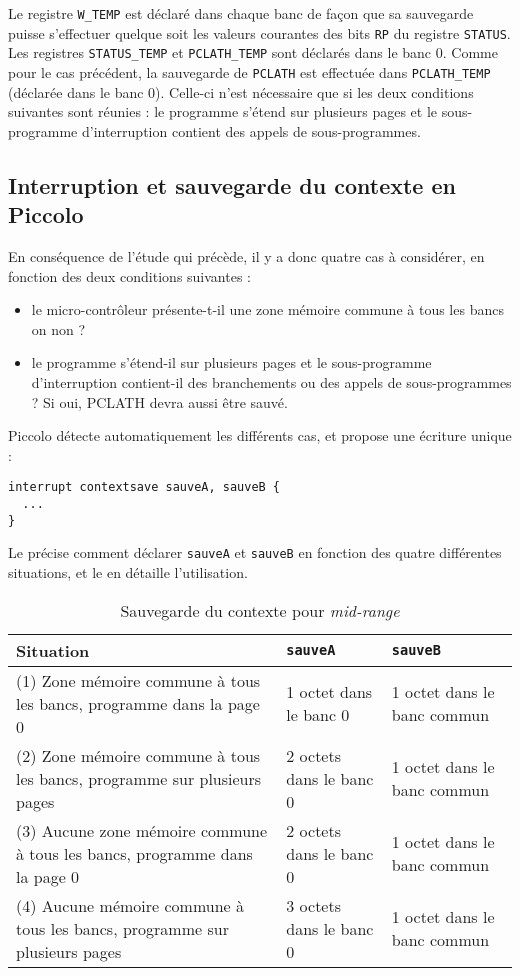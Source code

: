Le registre \texttt{W\_TEMP} est déclaré dans chaque banc de façon que sa sauvegarde puisse s’effectuer quelque soit les valeurs courantes des bits \texttt{RP} du registre \texttt{STATUS}. Les registres \texttt{STATUS\_TEMP} et \texttt{PCLATH\_TEMP} sont déclarés dans le banc 0. Comme pour le cas précédent, la sauvegarde de \texttt{PCLATH} est effectuée dans \texttt{PCLATH\_TEMP} (déclarée dans le banc 0). Celle-ci n'est nécessaire que si les deux conditions suivantes sont réunies : le programme s’étend sur plusieurs pages et le sous-programme d’interruption contient des appels de sous-programmes.


\subsection{Interruption et sauvegarde du contexte en Piccolo}

En conséquence de l'étude qui précède, il y a donc quatre cas à considérer, en fonction des deux conditions suivantes :
\begin{itemize}
  \item le micro-contrôleur présente-t-il une zone mémoire commune à tous les bancs on non ?
  \item le programme s’étend-il sur plusieurs pages et le sous-programme d’interruption contient-il des branchements ou des appels de sous-programmes ? Si oui, PCLATH devra aussi être sauvé.
\end{itemize}


Piccolo détecte automatiquement les différents cas, et propose une écriture unique :
\begin{lstlisting}[language=piccolo]
interrupt contextsave sauveA, sauveB {
  ...
}
\end{lstlisting}

Le  précise comment déclarer \texttt{sauveA} et \texttt{sauveB} en fonction des quatre différentes situations, et le  en détaille l'utilisation.

\begin{table}[!ht]
  \centering
  \begin{tabular}{p{5cm}p{4cm}p{4cm}}
    \textbf{Situation} & \texttt{\bf sauveA} & \texttt{\bf sauveB}\\
    \hline
    (1) Zone mémoire commune à tous les bancs, programme dans la page 0 & 1 octet dans le banc 0 & 1 octet dans le banc commun\\
    (2) Zone mémoire commune à tous les bancs, programme sur plusieurs pages & 2 octets dans le banc 0 & 1 octet dans le banc commun\\
    (3) Aucune zone mémoire commune à tous les bancs, programme dans la page 0 & 2 octets dans le banc 0 & 1 octet dans le banc commun\\
    (4) Aucune mémoire commune à tous les bancs, programme sur plusieurs pages & 3 octets dans le banc 0 & 1 octet dans le banc commun\\
  \hline
  \end{tabular}
  \caption{Sauvegarde du contexte pour \emph{mid-range}}
\end{table}

